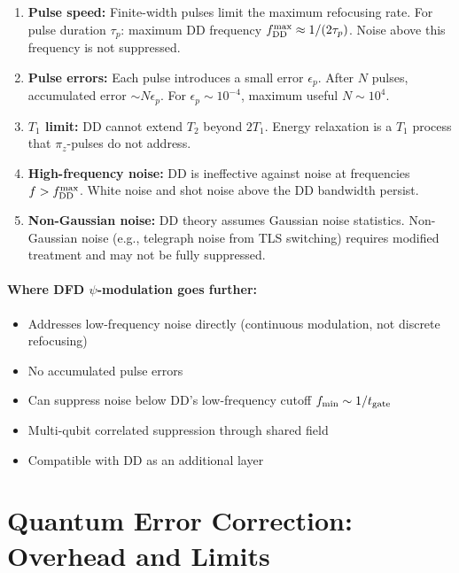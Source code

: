 \documentclass[11pt,letterpaper]{article}
\begin{document}
\begin{enumerate}
\item \textbf{Pulse speed:} Finite-width pulses limit the maximum
refocusing rate. For pulse duration $\tau_p$: maximum DD frequency
$f_{\rm DD}^{\rm max} \approx 1/(2\tau_p)$. Noise above this frequency
is not suppressed.

\item \textbf{Pulse errors:} Each pulse introduces a small error
$\epsilon_p$. After $N$ pulses, accumulated error $\sim N\epsilon_p$.
For $\epsilon_p \sim 10^{-4}$, maximum useful $N \sim 10^4$.

\item \textbf{$T_1$ limit:} DD cannot extend $T_2$ beyond $2T_1$.
Energy relaxation is a $T_1$ process that $\pi_z$-pulses do not address.

\item \textbf{High-frequency noise:} DD is ineffective against noise at
frequencies $f > f_{\rm DD}^{\rm max}$. White noise and shot noise above
the DD bandwidth persist.

\item \textbf{Non-Gaussian noise:} DD theory assumes Gaussian noise
statistics. Non-Gaussian noise (e.g., telegraph noise from TLS switching)
requires modified treatment and may not be fully suppressed.
\end{enumerate}

\paragraph{Where DFD $\psi$-modulation goes further:}
\begin{itemize}
\item Addresses low-frequency noise directly (continuous modulation, not
discrete refocusing)
\item No accumulated pulse errors
\item Can suppress noise below DD's low-frequency cutoff
$f_{\rm min} \sim 1/t_{\rm gate}$
\item Multi-qubit correlated suppression through shared field
\item Compatible with DD as an additional layer
\end{itemize}

\section{Quantum Error Correction: Overhead and Limits}
\end{document}

